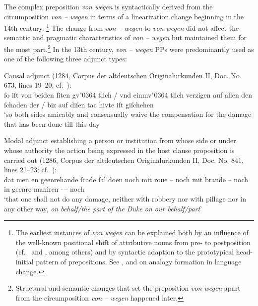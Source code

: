 \documentclass[output=paper
  ,nobabel
  ,draftmode
  ,babelshorthands
  ,colorlinks, citecolor=brown
]{langscibook}
\begin{document}
The complex preposition \emph{von wegen} is syntactically derived from the circumposition \emph{von – wegen} in terms of a linearization change beginning in the 14th century.%
%
\footnote{The earliest instances of \emph{von wegen} can be explained both by an influence of the well-known positional shift of attributive nouns from pre- to postposition (cf.\ \citealp[215–231]{Demske2001a} and \citealp[100–101]{NueblingEtAl2013}, among others) and by syntactic adaption to the prototypical head-initial pattern of  prepositions. See \citet[106–120]{Paul1920}, \citet[404–124]{Bloomfield1933} and \citet[14ff]{Becker1990} on analogy formation in language change.
}
The change from \emph{von – wegen} to \emph{von wegen} did not affect the semantic and pragmatic characteristics of \emph{von – wegen} but maintained them for the most part.\footnote{Structural and semantic changes that set the preposition \emph{von wegen} apart from the circumposition \emph{von – wegen} happened later.}
In the 13th century, \emph{von – wegen} PPs were predominantly used as one of the following three adjunct types:

\enlargethispage{-7pt}
\ea\label{ex-causaladj} 
Causal adjunct (1284, Corpus der altdeutschen
Originalurkunden II, Doc. No. 673, lines 19--20; cf.\ \citealp[86]{WilhelmNewald1943}):\\
\smallskip
    ſo iſt von beiden ſiten gv\char"0364 tlich / vnd einmv\char"0364 tlich verzigen auf allen den ſchaden der / biz auf diſen tac hivte iſt giſchehen\\
`so both sides amicably and consensually waive the compensation for the damage that has been done till this day 
\z


\ea\label{ex-modaladj} 
Modal adjunct establishing a person or institution from whose side or  under whose authority the action being expressed in the host clause proposition is carried out (1286, Corpus der altdeutschen Originalurkunden II, Doc. No. 841, lines 21--23; cf.\ \citealp[192]{WilhelmNewald1943}):\\
\smallskip
	dat men en geenrehande ſcade ſal doen noch mit roue -- noch mit brande -- noch in geenre maniren -  - noch \\
`that one shall not do any damage, neither with robbery nor with pillage nor in any other way, \emph{on behalf/the part of the Duke on our behalf/part}'
\z
\end{document}
